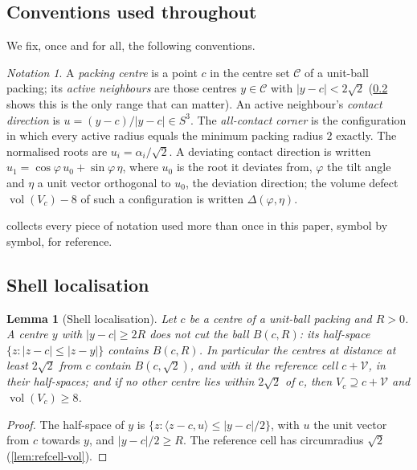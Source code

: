 \documentclass[11pt,reqno]{amsart}
\renewcommand{\_}{\origunderscore\allowbreak}
\numberwithin{equation}{section}
\theoremstyle{plain}
\newtheorem{lem}[thm]{Lemma}
\theoremstyle{definition}
\theoremstyle{remark}
\newtheorem{notation}[thm]{Notation}
\newcommand{\VCell}{\mathcal{V}}             %
\newcommand{\tilt}{\varphi}                  %
\newcommand{\dev}{\eta}                      %
\newcommand{\defect}{\Delta}                 %
\newcommand{\base}{u}                        %
\DeclareMathOperator{\vol}{vol}
\begin{document}
\subsection{Conventions used throughout}

We fix, once and for all, the following conventions.

\begin{notation}\label{not:conventions-new}
A \emph{packing centre} is a point $c$ in the centre set $\mathcal{C}$
of a unit-ball packing; its \emph{active neighbours} are those centres
$y\in\mathcal{C}$ with $|y-c|<2\sqrt2$ (\cref{sec:shell-new} shows this
is the only range that can matter). An active neighbour's \emph{contact
direction} is $u=(y-c)/|y-c|\in S^3$. The \emph{all-contact corner} is
the configuration in which every active radius equals the minimum
packing radius $2$ exactly. The normalised roots are
$\base_i=\alpha_i/\sqrt2$. A deviating contact direction is written
$\base_1=\cos\tilt\,\base_0+\sin\tilt\,\dev$, where $\base_0$ is the root
it deviates from, $\tilt$ the tilt angle and $\dev$ a unit vector
orthogonal to $\base_0$, the deviation direction; the volume defect
$\vol(V_c)-8$ of such a configuration is written $\defect(\tilt,\dev)$.
\end{notation}

 collects every piece of notation used more than
once in this paper, symbol by symbol, for reference.

\subsection{Shell localisation}\label{sec:shell-new}

\begin{lem}[Shell localisation]\label{lem:shell-new}
Let $c$ be a centre of a unit-ball packing and $R>0$. A centre $y$ with
$|y-c|\ge2R$ does not cut the ball $B(c,R)$: its half-space
$\{z:|z-c|\le|z-y|\}$ contains $B(c,R)$. In particular the centres at
distance at least $2\sqrt2$ from $c$ contain $B(c,\sqrt2)$, and with it
the reference cell $c+\VCell$, in their half-spaces; and if no other
centre lies within $2\sqrt2$ of $c$, then $V_c\supseteq c+\VCell$ and
$\vol(V_c)\ge8$.
\end{lem}

\begin{proof}
The half-space of $y$ is $\{z:\langle z-c,u\rangle\le|y-c|/2\}$, with $u$
the unit vector from $c$ towards $y$, and $|y-c|/2\ge R$. The reference
cell has circumradius $\sqrt2$ (\cref{lem:refcell-vol}).
\end{proof}
\end{document}
